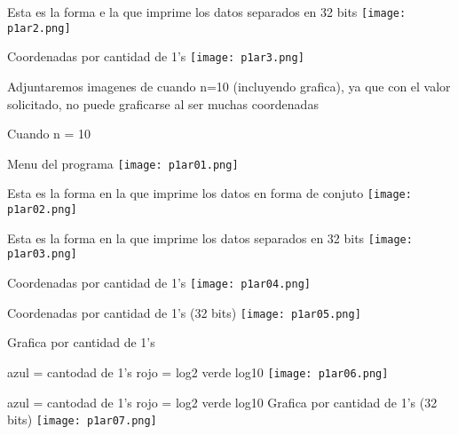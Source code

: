 \documentclass{article}
\begin{document}
\begin{flushleft}
Esta es la forma e la que imprime los datos separados en 32 bits
\texttt{[image: p1ar2.png]}

Coordenadas por cantidad de 1's
\texttt{[image: p1ar3.png]}

Adjuntaremos imagenes de cuando n=10 (incluyendo grafica), ya que con el valor solicitado, no puede graficarse al ser muchas coordenadas

Cuando n = 10

Menu del programa
\texttt{[image: p1ar01.png]}

Esta es la forma en la que imprime los datos en forma de conjuto
\texttt{[image: p1ar02.png]}

Esta es la forma en la que imprime los datos separados en 32 bits
\texttt{[image: p1ar03.png]}

Coordenadas por cantidad de 1's
\texttt{[image: p1ar04.png]}

Coordenadas por cantidad de 1's (32 bits)
\texttt{[image: p1ar05.png]}

Grafica por cantidad de 1's

azul = cantodad de 1's
rojo = log2
verde log10
\texttt{[image: p1ar06.png]}

azul = cantodad de 1's
rojo = log2
verde log10
Grafica por cantidad de 1's (32 bits)
\texttt{[image: p1ar07.png]}

\end{flushleft}
\end{document}
